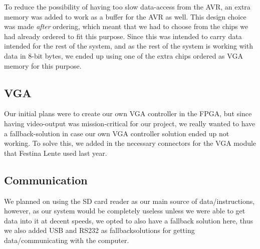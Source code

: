 To reduce the possibility of having too slow data-access from the AVR, an extra memory was added to work as
a buffer for the AVR as well. This design choice was made {\em after} ordering, which meant that we had to choose from
the chips we had already ordered to fit this purpose. Since this was intended to carry data intended for the rest
of the system, and as the rest of the system is working with data in 8-bit bytes, we ended up using one of the
extra chips ordered as \ac{VGA} memory for this purpose.

\subsection{VGA}
Our initial plans were to create our own \ac{VGA} controller in the \ac{FPGA}, but since having video-output was mission-critical
for our project, we really wanted to have a fallback-solution in case our own
\ac{VGA} controller solution ended up not working.
To solve this, we added in the necessary connectors for the \ac{VGA} module that Festina Lente used last year.

\subsection {Communication}
We planned on using the \ac{SD} card reader as our main source of data/instructions, however, as our system would
be completely useless unless we were able to get data into it at decent speeds, we opted to also have a fallback
solution here, thus we also added \ac{USB} and RS232 as fallbacksolutions for getting data/communicating with the
computer.
